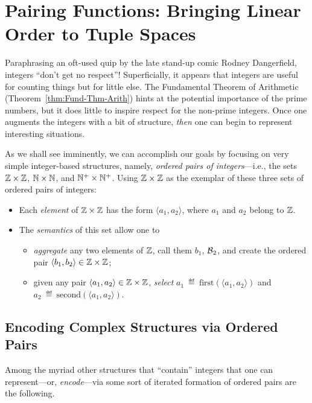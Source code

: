 \section{Pairing Functions: Bringing Linear Order to Tuple Spaces}
\label{sec:pairing}

Paraphrasing an oft-used quip by the late stand-up comic Rodney
Dangerfield, integers ``don't get no respect''!  Superficially, it
appears that integers are useful for counting things but for little
else.  The Fundamental Theorem of Arithmetic
(Theorem~\ref{thm:Fund-Thm-Arith}) hints at the potential importance
of the prime numbers, but it does little to inspire respect for the
non-prime integers.  Once one augments the integers with a bit of
structure, {\em then} one can begin to represent interesting
situations.

As we shall see imminently, we can accomplish our goals by focusing on
very simple integer-based structures, namely, {\em ordered pairs of
  integers}---i.e.,
the sets $\mathbb{Z} \times \mathbb{Z}$, $\mathbb{N} \times \mathbb{N}$, and $\mathbb{N}^+ \times \mathbb{N}^+$.
Using $\mathbb{Z} \times \mathbb{Z}$ as the exemplar of these three sets of ordered
pairs of integers:
\begin{itemize}
\item
Each {\em element} of $\mathbb{Z} \times \mathbb{Z}$ has the form $\langle a_1, a_2
\rangle$, where $a_1$ and $a_2$ belong to $\mathbb{Z}$.
\item
The {\em semantics} of this set allow one to
  \begin{itemize}
  \item
{\em aggregate} any two elements of $\mathbb{Z}$, call them $b_1$, $\mbox{$\cal B$}_2$, and
create the ordered pair $\langle b_1, b_2 \rangle \in \mathbb{Z} \times \mathbb{Z}$;
  \item
given any pair $\langle a_1, a_2 \rangle \in \mathbb{Z} \times \mathbb{Z}$, {\em
  select} $a_1 \ \eqdef \ \mbox{first}(\langle a_1, a_2 \rangle)$ and
$a_2 \ \eqdef \ \mbox{second}(\langle a_1, a_2 \rangle)$.
  \end{itemize}
\end{itemize}

\subsection{Encoding Complex Structures via Ordered Pairs}
\label{sec:encodings-via-ordered-pairs}

Among the myriad other structures that ``contain'' integers that one
can represent---or, {\it encode}---via some sort of iterated formation
of ordered pairs are the following.

